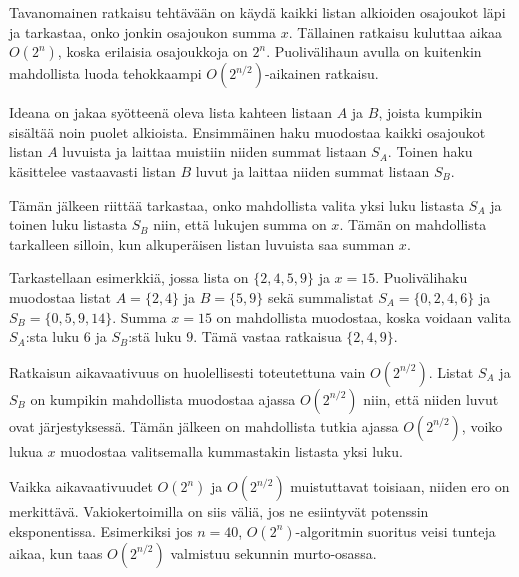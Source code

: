 Tavanomainen ratkaisu tehtävään on käydä kaikki
listan alkioiden osajoukot läpi ja tarkastaa,
onko jonkin osajoukon summa $x$.
Tällainen ratkaisu kuluttaa aikaa $O(2^n)$,
koska erilaisia osajoukkoja on $2^n$.
Puolivälihaun avulla on kuitenkin mahdollista luoda
tehokkaampi $O(2^{n/2})$-aikainen ratkaisu.

Ideana on jakaa syötteenä oleva lista
kahteen listaan $A$ ja $B$,
joista kumpikin sisältää noin puolet alkioista.
Ensimmäinen haku muodostaa kaikki osajoukot
listan $A$ luvuista ja laittaa muistiin niiden summat
listaan $S_A$.
Toinen haku käsittelee vastaavasti listan $B$ luvut
ja laittaa niiden summat listaan $S_B$.

Tämän jälkeen riittää tarkastaa,
onko mahdollista valita yksi luku listasta $S_A$
ja toinen luku listasta $S_B$ niin,
että lukujen summa on $x$.
Tämän on mahdollista tarkalleen silloin,
kun alkuperäisen listan luvuista saa summan $x$.

Tarkastellaan esimerkkiä,
jossa lista on $\{2,4,5,9\}$
ja $x=15$.
Puolivälihaku muodostaa listat $A=\{2,4\}$
ja $B=\{5,9\}$ sekä summalistat
$S_A=\{0,2,4,6\}$ ja $S_B=\{0,5,9,14\}$.
Summa $x=15$ on mahdollista muodostaa,
koska voidaan valita $S_A$:sta luku $6$
ja $S_B$:stä luku $9$.
Tämä vastaa ratkaisua $\{2,4,9\}$.

Ratkaisun aikavaativuus on huolellisesti toteutettuna
vain $O(2^{n/2})$.
Listat $S_A$ ja $S_B$ on kumpikin mahdollista
muodostaa ajassa $O(2^{n/2})$ niin,
että niiden luvut ovat järjestyksessä.
Tämän jälkeen on mahdollista tutkia ajassa
$O(2^{n/2})$, voiko lukua $x$ muodostaa
valitsemalla kummastakin listasta yksi luku.

Vaikka aikavaativuudet $O(2^n)$ ja $O(2^{n/2})$
muistuttavat toisiaan, niiden ero on merkittävä.
Vakiokertoimilla on siis väliä, jos ne esiintyvät
potenssin eksponentissa.
Esimerkiksi jos $n=40$, $O(2^n)$-algoritmin suoritus
veisi tunteja aikaa, kun taas $O(2^{n/2})$
valmistuu sekunnin murto-osassa.
